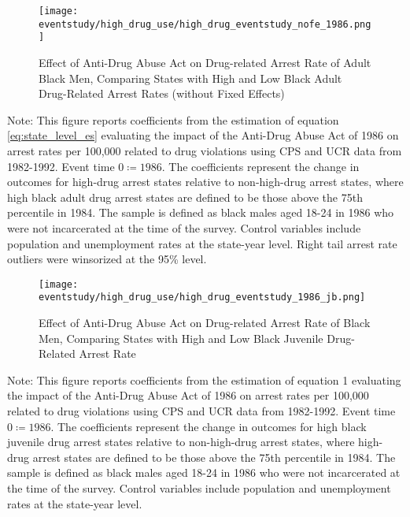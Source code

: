   \begin{figure}[H]
    \caption{Effect of Anti-Drug Abuse Act on Drug-related Arrest Rate of Adult Black Men, Comparing States with High and Low Black Adult Drug-Related Arrest Rates (without Fixed Effects)}
    \centering
    \texttt{[image: eventstudy/high\_drug\_use/high\_drug\_eventstudy\_nofe\_1986.png]}
    \label{fig:ab_es_1986_nofe}
  \end{figure}
  
  \begin{footnotesize}
    \noindent Note: This figure reports coefficients from the estimation of equation \ref{eq:state_level_es} evaluating the impact of the Anti-Drug Abuse Act of 1986 on arrest rates per 100,000 related to drug violations using CPS and UCR data from 1982-1992. Event time $0 \coloneqq 1986$. The coefficients represent the change in outcomes for high-drug arrest states relative to non-high-drug arrest states, where high black adult drug arrest states are defined to be those above the 75th percentile in 1984. The sample is defined as black males aged 18-24 in 1986 who were not incarcerated at the time of the survey. Control variables include population and unemployment rates at the state-year level. Right tail arrest rate outliers were winsorized at the 95\% level.
  \end{footnotesize}
  
  \clearpage

  \begin{figure}[h]
    \caption{Effect of Anti-Drug Abuse Act on Drug-related Arrest Rate of Black Men, Comparing States with High and Low Black Juvenile Drug-Related Arrest Rate}
    \centering
    \texttt{[image: eventstudy/high\_drug\_use/high\_drug\_eventstudy\_1986\_jb.png]}
    \label{fig:jb_es_1986}
  \end{figure}

  \begin{footnotesize}
    \noindent Note: This figure reports coefficients from the estimation of equation 1 evaluating the impact of the Anti-Drug Abuse Act of 1986 on arrest rates per 100,000 related to drug violations using CPS and UCR data from 1982-1992. Event time $0 \coloneqq 1986$. The coefficients represent the change in outcomes for high black juvenile drug arrest states relative to non-high-drug arrest states, where high-drug arrest states are defined to be those above the 75th percentile in 1984. The sample is defined as black males aged 18-24 in 1986 who were not incarcerated at the time of the survey. Control variables include population and unemployment rates at the state-year level. 
  \end{footnotesize}

